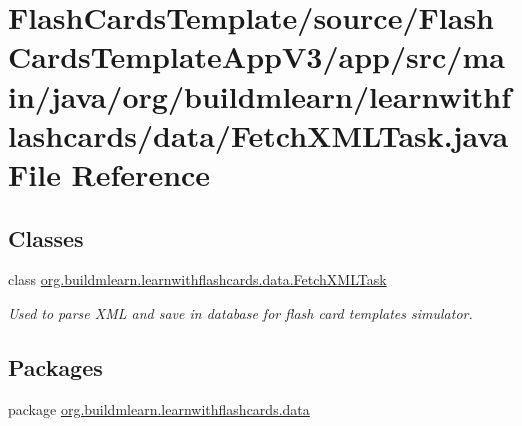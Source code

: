 \hypertarget{FlashCardsTemplate_2source_2FlashCardsTemplateAppV3_2app_2src_2main_2java_2org_2buildmlearn_2lea7147219f10f80a2a969a0e0b2a135cc7}{}\section{Flash\+Cards\+Template/source/\+Flash\+Cards\+Template\+App\+V3/app/src/main/java/org/buildmlearn/learnwithflashcards/data/\+Fetch\+X\+M\+L\+Task.java File Reference}
\label{FlashCardsTemplate_2source_2FlashCardsTemplateAppV3_2app_2src_2main_2java_2org_2buildmlearn_2lea7147219f10f80a2a969a0e0b2a135cc7}
\subsection*{Classes}
\begin{DoxyCompactItemize}
\item 
class \hyperlink{classorg_1_1buildmlearn_1_1learnwithflashcards_1_1data_1_1FetchXMLTask}{org.\+buildmlearn.\+learnwithflashcards.\+data.\+Fetch\+X\+M\+L\+Task}
\begin{DoxyCompactList}\small\item\em Used to parse X\+ML and save in database for flash card template\textquotesingle{}s simulator. \end{DoxyCompactList}\end{DoxyCompactItemize}
\subsection*{Packages}
\begin{DoxyCompactItemize}
\item 
package \hyperlink{namespaceorg_1_1buildmlearn_1_1learnwithflashcards_1_1data}{org.\+buildmlearn.\+learnwithflashcards.\+data}
\end{DoxyCompactItemize}

